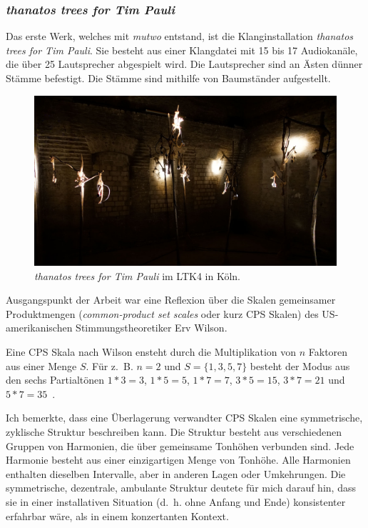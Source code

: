 \documentclass[12pt,a4paper,ngerman]{article}
\begin{document}
\subsubsection{\emph{thanatos trees for Tim Pauli}}

Das erste Werk, welches mit \emph{mutwo} entstand, ist die Klanginstallation \emph{thanatos trees for Tim Pauli}.
Sie besteht aus einer Klangdatei mit 15 bis 17 Audiokanäle, die über 25 Lautsprecher abgespielt wird.
Die Lautsprecher sind an Ästen dünner Stämme befestigt.
Die Stämme sind mithilfe von Baumständer aufgestellt.

\begin{figure}[h!]
    \includegraphics[scale=0.28]{pictures/ltk4_open_call_2021_6.jpg}

    \caption{%
        \emph{thanatos trees for Tim Pauli} im LTK4 in Köln.
    }
\end{figure}

Ausgangspunkt der Arbeit war eine Reflexion über die Skalen gemeinsamer Produktmengen (\emph{common-product set scales} oder kurz CPS Skalen) des US-amerikanischen Stimmungstheoretiker Erv Wilson.

\smallskip

Eine CPS Skala nach Wilson ensteht durch die Multiplikation von $n$ Faktoren aus einer Menge $S$.
Für z.~B. $n=2$ und $S=\{1, 3, 5, 7\}$ besteht der Modus aus den sechs Partialtönen $1*3=3$, $1*5=5$, $1*7=7$, $3*5=15$, $3*7=21$ und $5*7=35$~\parencite[S. 150f]{ervWilsonBook}.

\smallskip

Ich bemerkte, dass eine Überlagerung verwandter CPS Skalen eine symmetrische, zyklische Struktur beschreiben kann.
Die Struktur besteht aus verschiedenen Gruppen von Harmonien, die über gemeinsame Tonhöhen verbunden sind.
Jede Harmonie besteht aus einer einzigartigen Menge von Tonhöhe.
Alle Harmonien enthalten dieselben Intervalle, aber in anderen Lagen oder Umkehrungen.
Die symmetrische, dezentrale, ambulante Struktur deutete für mich darauf hin, dass sie in einer installativen Situation (d.~h. ohne Anfang und Ende) konsistenter erfahrbar wäre, als in einem konzertanten Kontext.
\end{document}
